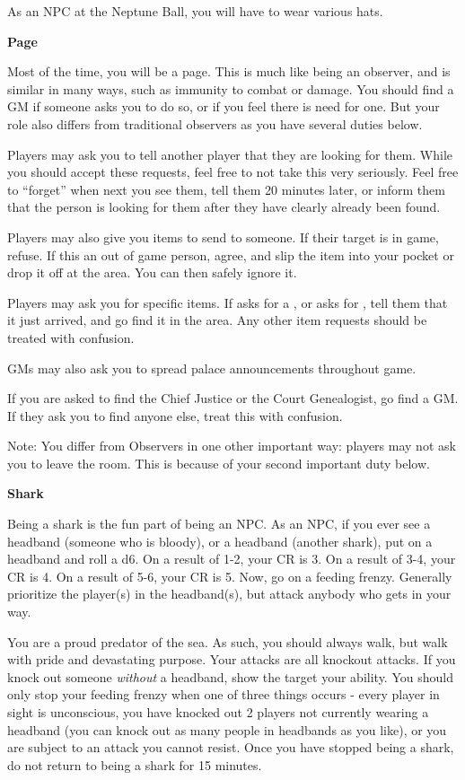 \documentclass[green]{NeptuneBall}
\begin{document}
\name{\gNPC{}}

As an NPC at the Neptune Ball, you will have to wear various hats.

{\bf Page}

Most of the time, you will be a page. This is much like being an observer, and is similar in many ways, such as immunity to combat or damage. You should find a GM if someone asks you to do so, or if you feel there is need for one. But your role also differs from traditional observers as you have several duties below.

Players may ask you to tell another player that they are looking for them. While you should accept these requests, feel free to not take this very seriously. Feel free to "`forget"' when next you see them, tell them 20 minutes later, or inform them that the person is looking for them after they have clearly already been found. 

Players may also give you items to send to someone. If their target is in game, refuse. If this an out of game person, agree, and slip the item into your pocket or drop it off at the \pGM{} area. You can then safely ignore it.

Players may ask you for specific items. If \cPriest{} asks for a \iBaby{}, or \cSpy{} asks for \iScroll{}, tell them that it just arrived, and go find it in the \pGM{} area. Any other item requests should be treated with confusion.

GMs may also ask you to spread palace announcements throughout game.

If you are asked to find the Chief Justice or the Court Genealogist, go find a GM. If they ask you to find anyone else, treat this with confusion.

Note: You differ from Observers in one other important way: players may not ask you to leave the room. This is because of your second important duty below.

{\bf Shark}

Being a shark is the fun part of being an NPC. As an NPC, if you ever see a  headband (someone who is bloody), or a  headband (another shark), put on a  headband and roll a d6. On a result of 1-2, your CR is 3. On a result of 3-4, your CR is 4. On a result of 5-6, your CR is 5. Now, go on a feeding frenzy. Generally prioritize the player(s) in the  headband(s), but attack anybody who gets in your way. 

You are a proud predator of the sea. As such, you should always walk, but walk with pride and devastating purpose. Your attacks are all knockout attacks. If you knock out someone \emph{without} a  headband, show the target your \aShark{} ability. You should only stop your feeding frenzy when one of three things occurs - every player in sight is unconscious, you have knocked out 2 players not currently wearing a  headband (you can knock out as many people in  headbands as you like), or you are subject to an attack you cannot resist. Once you have stopped being a shark, do not return to being a shark for 15 minutes.
\end{document}
